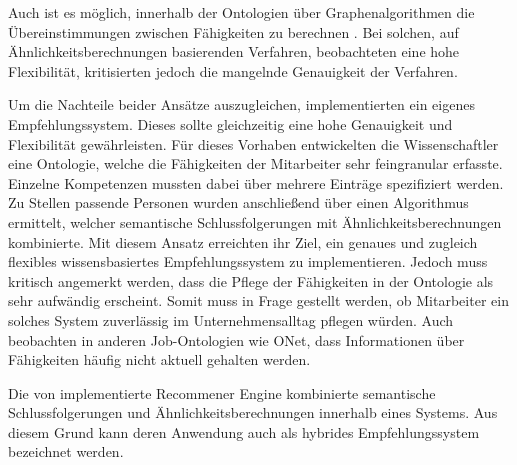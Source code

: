 Auch ist es möglich, innerhalb der Ontologien über Graphenalgorithmen die Übereinstimmungen zwischen Fähigkeiten zu berechnen \cite[S. 1f.]{balachander:2018}. Bei solchen, auf Ähnlichkeitsberechnungen basierenden Verfahren, beobachteten \textcite[S. 4]{bianchini:2008} eine hohe Flexibilität, kritisierten jedoch die mangelnde Genauigkeit der Verfahren.

Um die Nachteile beider Ansätze auszugleichen, implementierten \textcite[S. 4ff.]{semanticMatchmaking:2009} ein eigenes Empfehlungssystem. Dieses sollte gleichzeitig eine hohe Genauigkeit und Flexibilität gewährleisten. Für dieses Vorhaben entwickelten die Wissenschaftler eine Ontologie, welche die Fähigkeiten der Mitarbeiter sehr feingranular erfasste. Einzelne Kompetenzen mussten dabei über mehrere Einträge spezifiziert werden. Zu Stellen passende Personen wurden anschließend über einen Algorithmus ermittelt, welcher semantische Schlussfolgerungen mit Ähnlichkeitsberechnungen kombinierte. Mit diesem Ansatz erreichten \textcite[S. 11f.]{semanticMatchmaking:2009} ihr Ziel, ein genaues und zugleich flexibles wissensbasiertes Empfehlungssystem zu implementieren. Jedoch muss kritisch angemerkt werden, dass die Pflege der Fähigkeiten in der Ontologie als sehr aufwändig erscheint. Somit muss in Frage gestellt werden, ob Mitarbeiter ein solches System zuverlässig im Unternehmensalltag pflegen würden. Auch \textcite[S. 2]{aCombinedRepresentation:2018} beobachten in anderen Job-Ontologien wie \ac{ONet}, dass Informationen über Fähigkeiten häufig nicht aktuell gehalten werden.

Die von \textcite[S. 1]{semanticMatchmaking:2009} implementierte Recommener Engine kombinierte semantische Schlussfolgerungen und Ähnlichkeitsberechnungen innerhalb eines Systems. Aus diesem Grund kann deren Anwendung auch als hybrides Empfehlungssystem bezeichnet werden.

